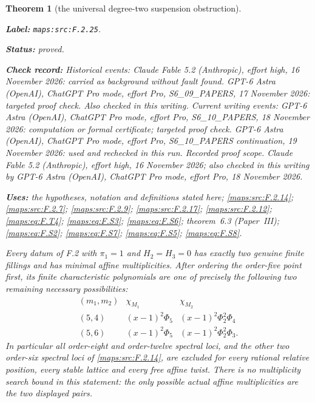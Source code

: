 \documentclass[11pt,a4paper]{article}
\newtheorem{theorem}{Theorem}[section]
\theoremstyle{definition}
\newcommand{\StatementRecord}[4]{\par\smallskip\begingroup\upshape\raggedright\noindent\textbf{Label:} \nolinkurl{#1}.\par\noindent\textbf{Status:} #2.\par\noindent\textbf{Check record:} #3.\par\noindent\textbf{Uses:} #4.\par\endgroup\smallskip}
\newcommand{\ExternalPaperRef}[3]{\ifmmode\text{\upshape #1#2 (Paper~#3)}\else #1#2 (Paper~#3)\fi}
\begin{document}
\begin{theorem}[the universal degree-two suspension obstruction]\label{maps:src:F.2.25}
\StatementRecord{maps:src:F.2.25}{proved}{Historical events: Claude Fable 5.2 (Anthropic), effort high, 16 November 2026: carried as background without fault found. GPT-6 Astra (OpenAI), ChatGPT Pro mode, effort Pro, S6\_09\_PAPERS, 17 November 2026: targeted proof check. Also checked in this writing. Current writing events: GPT-6 Astra (OpenAI), ChatGPT Pro mode, effort Pro, S6\_10\_PAPERS, 18 November 2026: computation or formal certificate; targeted proof check. GPT-6 Astra (OpenAI), ChatGPT Pro mode, effort Pro, S6\_10\_PAPERS continuation, 19 November 2026: used and rechecked in this run. \emph{Recorded proof scope.} Claude Fable 5.2 (Anthropic), effort high, 16 November 2026; also checked in this writing by GPT-6 Astra (OpenAI), ChatGPT Pro mode, effort Pro, 18 November 2026}{the hypotheses, notation and definitions stated here; \cref{maps:src:F.2.14}; \cref{maps:src:F.2.7}; \cref{maps:src:F.2.9}; \cref{maps:src:F.2.17}; \cref{maps:src:F.2.12}; \cref{maps:eq:F.T4}; \cref{maps:eq:F.S3}; \cref{maps:eq:F.S6}; \ExternalPaperRef{theorem~}{6.3}{III}; \cref{maps:eq:F.S2}; \cref{maps:eq:F.S7}; \cref{maps:eq:F.S5}; \cref{maps:eq:F.S8}}


Every datum of F.2 with $\pi_1=1$ and $H_2=H_3=0$ has
exactly two genuine finite fillings and has minimal affine
multiplicities.  After ordering the order-five point first,
its finite characteristic polynomials are one of precisely
the following two remaining necessary possibilities:
\[
\begin{array}{c|c|c}
 (m_1,m_2)&\chi_{M_1}&\chi_{M_2}\\\hline
 (5,4)&(x-1)^2\Phi_5&(x-1)^2\Phi_2^2\Phi_4\\
 (5,6)&(x-1)^2\Phi_5&(x-1)^2\Phi_2^2\Phi_3.
\end{array}
 \tag{F.S1}\label{maps:eq:F.S1}
\]
In particular all order-eight and order-twelve spectral
loci, and the other two order-six spectral loci of \ref{maps:src:F.2.14},
are excluded for every rational relative position, every
stable lattice and every free affine twist.
There is no multiplicity search bound in this statement:
the only possible actual affine multiplicities are the
two displayed pairs.

\end{theorem}
\end{document}
